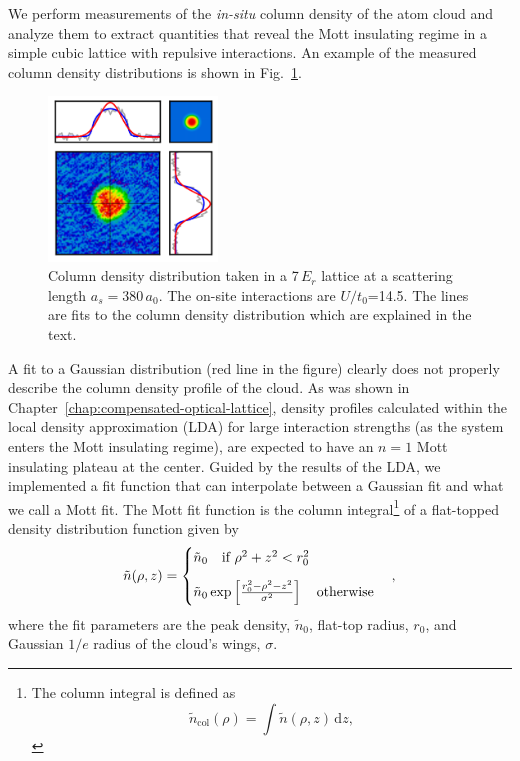 We perform measurements of the \textit{in-situ} column density of the
atom cloud and analyze them to extract quantities that reveal the Mott
insulating regime in a simple cubic lattice with repulsive interactions.
An example of the measured column density distributions is shown in
Fig.~\ref{fig:mott-fit-cloud}. 
\begin{figure}
    \centering
\includegraphics[width=0.4\textwidth]{../figures/mott/mott-fit-cloud.png}
\caption{\small Column density distribution taken in a 7\,$E_{r}$ lattice at a
scattering length $a_{s}=380\,a_{0}$.  The on-site interactions are
$U/t_{0}$=14.5. The lines are fits to the column density
distribution which are explained in the text. }  
\label{fig:mott-fit-cloud}
\end{figure}
A fit to a Gaussian distribution (red line in the figure)  clearly does not
properly describe the column density profile of the cloud.   As was shown in
Chapter~\ref{chap:compensated-optical-lattice}, density profiles calculated
within the local density approximation (LDA) for large interaction strengths
(as the system enters the Mott insulating regime), are expected to have an
$n=1$ Mott insulating plateau at the center.  Guided by the results of the LDA,
we implemented a fit function that can interpolate between a Gaussian fit and
what we call a Mott fit.   The Mott fit function is the column
integral\footnote{ The column integral is defined as  
\begin{equation}
 \tilde{n}_{\mathrm{col}}(\rho) = \int \tilde{n}( \rho, z ) \,\mathrm{d}z , 
\end{equation}}
of a flat-topped density distribution function given by
\begin{equation}
 \tilde{n}(\rho,z) = \begin{cases} 
  \tilde{n}_{0}  ~~~\text{if $\rho^{2} + z^{2} < r_{0}^{2}  $}  & 
      \vspace{0.9em} \\   
  \tilde{n}_{0} \exp\left[ \frac{ r_{0}^{2} - \rho^{2} - z^{2}}
                        { \sigma^{2}  } \right]  ~~~ 
                    \text{otherwise} & 
  \end{cases}, 
\end{equation} 
where the fit parameters are the peak density, $\tilde{n}_{0}$, flat-top
radius, $r_{0}$, and Gaussian $1/e$ radius of the cloud's wings, $\sigma$.  

